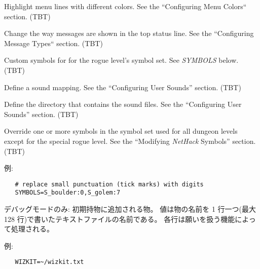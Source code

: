 \item[\bb{MENUCOLOR}]
Highlight menu lines with different colors.
See the ``Configuring Menu Colors`` section.
(TBT)
\item[\bb{MSGTYPE}]
Change the way messages are shown in the top status line.
See the ``Configuring Message Types`` section.
(TBT)
\item[\bb{ROGUESYMBOLS}]
Custom symbols for for the rogue level's symbol set.
See {\it SYMBOLS} below.
(TBT)
\item[\bb{SOUND}]
Define a sound mapping.
See the ``Configuring User Sounds'' section.
(TBT)
\item[\bb{SOUNDDIR}]
Define the directory that contains the sound files.
See the ``Configuring User Sounds'' section.
(TBT)
\item[\bb{SYMBOLS}]
Override one or more symbols in the symbol set used for all dungeon
levels except for the special rogue level.
See the ``Modifying {\it NetHack\/} Symbols'' section.
(TBT)

例:
\begin{verbatim}
   # replace small punctuation (tick marks) with digits
   SYMBOLS=S_boulder:0,S_golem:7
\end{verbatim}

\item[\bb{WIZKIT}]
デバッグモードのみ: 初期持物に追加される物。
値は物の名前を 1 行一つ(最大 128 行)で書いたテキストファイルの名前である。
各行は願いを扱う機能によって処理される。

例:
\begin{verbatim}
   WIZKIT=~/wizkit.txt
\end{verbatim}
\elist


